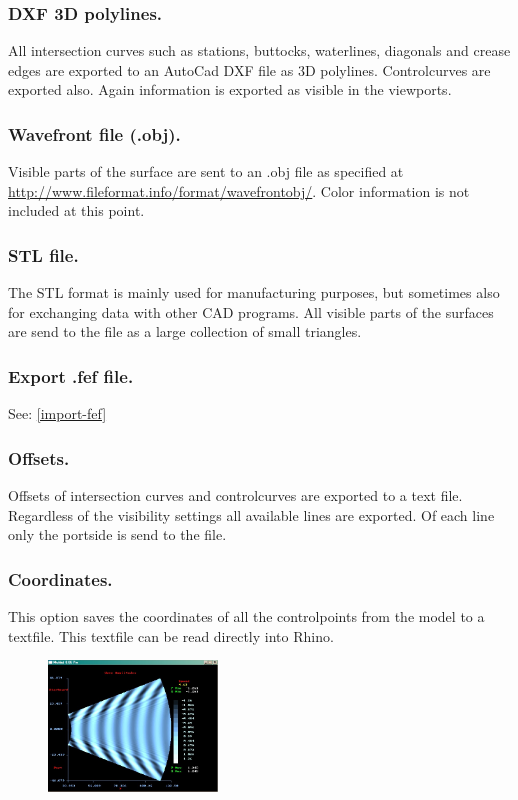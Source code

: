 \documentclass[12pt]{article}
\begin{document}
\subsubsection{DXF 3D polylines.}
All intersection curves such as stations, buttocks, waterlines,
diagonals and crease edges are exported to an AutoCad DXF file as 3D
polylines. Controlcurves are exported also. Again information is
exported as visible in the viewports.

\subsubsection{Wavefront file (.obj).}
Visible parts of the surface are sent to an .obj file as specified at
\url{http://www.fileformat.info/format/wavefrontobj/}. Color information is not included at this point.

\subsubsection{STL file.}
The STL format is mainly used for manufacturing purposes, but
sometimes also for exchanging data with other CAD programs. All
visible parts of the surfaces are send to the file as a large
collection of small triangles.

\subsubsection{Export .fef file.}
See: \ref{import-fef}

\subsubsection{Offsets.}
Offsets of intersection curves and controlcurves are exported to a
text file. Regardless of the visibility settings all available lines
are exported. Of each line only the portside is send to the file.

\subsubsection{Coordinates.}
This option saves the coordinates of all the controlpoints from the
model to a textfile. This textfile can be read directly into Rhino.

\begin{figure}
        \centering
        \includegraphics[width=0.4\textwidth,natwidth=533,natheight=413]{michletscreenshot.png}
        \caption{}
        \label{fig:michletscreenshot}
\end{figure}
\end{document}
